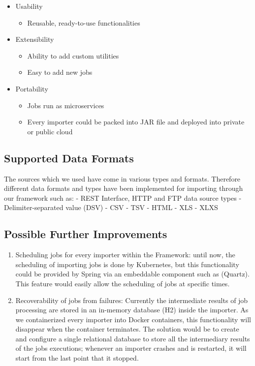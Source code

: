 \begin{itemize}
\tightlist
\item
  Usability

  \begin{itemize}
  \tightlist
  \item
    Reusable, ready-to-use functionalities
  \end{itemize}
\item
  Extensibility

  \begin{itemize}
  \tightlist
  \item
    Ability to add custom utilities
  \item
    Easy to add new jobs
  \end{itemize}
\item
  Portability

  \begin{itemize}
  \tightlist
  \item
    Jobs run as microservices
  \item
    Every importer could be packed into JAR file and deployed into
    private or public cloud
  \end{itemize}
\end{itemize}

\subsection{Supported Data Formats}\label{supported-data-formats}

The sources which we used have come in various types and formats.
Therefore different data formats and types have been implemented for
importing through our framework such as: - REST Interface, HTTP and FTP
data source types - Delimiter-separated value (DSV) - CSV - TSV - HTML -
XLS - XLXS

\subsection{Possible Further
Improvements}\label{possible-further-improvements}

\begin{enumerate}
\def\labelenumi{\arabic{enumi}.}
\tightlist
\item
  Scheduling jobs for every importer within the Framework: until now,
  the scheduling of importing jobs is done by Kubernetes, but this
  functionality could be provided by Spring via an embeddable component
  such as (Quartz). This feature would easily allow the scheduling of
  jobs at specific times.
\item
  Recoverability of jobs from failures: Currently the intermediate
  results of job processing are stored in an in-memory database (H2)
  inside the importer. As we containerized every importer into Docker
  containers, this functionality will disappear when the container
  terminates. The solution would be to create and configure a single
  relational database to store all the intermediary results of the jobs
  executions; whenever an importer crashes and is restarted, it will
  start from the last point that it stopped.
\end{enumerate}

